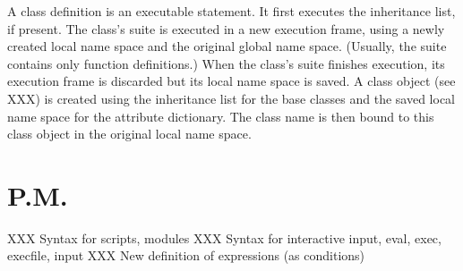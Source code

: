 A class definition is an executable statement.  It first executes the
inheritance list, if present.  The class's suite is executed in a new
execution frame, using a newly created local name space and the
original global name space.  (Usually, the suite contains only
function definitions.)  When the class's suite finishes execution, its
execution frame is discarded but its local name space is saved.  A
class object (see XXX) is created using the inheritance list for the
base classes and the saved local name space for the attribute
dictionary.  The class name is then bound to this class object in the
original local name space.

\section{P.M.}

XXX Syntax for scripts, modules
XXX Syntax for interactive input, eval, exec, execfile, input
XXX New definition of expressions (as conditions)



